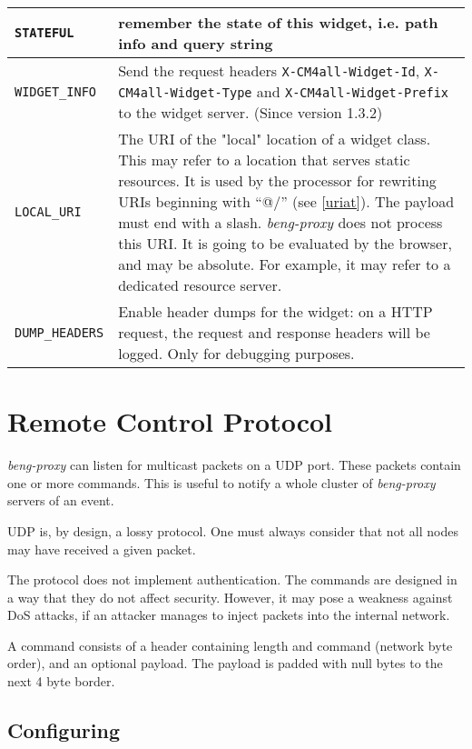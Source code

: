 \documentclass[a4paper,12pt]{article}
\begin{document}
\begin{longtable}{|l|p{8cm}|}
\verb|STATEFUL| & remember the state of this widget, i.e. path info
and query string \\

\hline

\verb|WIDGET_INFO| & Send the request headers
\verb|X-CM4all-Widget-Id|, \verb|X-CM4all-Widget-Type| and
\verb|X-CM4all-Widget-Prefix| to the widget server.
\scriptsize{(Since version 1.3.2)}\\

\hline

\label{localuri}
\verb|LOCAL_URI| & The URI of the "local" location of a widget class.
This may refer to a location that serves static resources.  It is used
by the processor for rewriting URIs beginning with ``@/'' (see
\ref{uriat}).  The payload must end with a slash.  \emph{beng-proxy}
does not process this URI.  It is going to be evaluated by the
browser, and may be absolute.  For example, it may refer to a
dedicated resource server. \\

\hline

\verb|DUMP_HEADERS| & Enable header dumps for the widget: on a HTTP
request, the request and response headers will be logged.  Only for
debugging purposes. \\

\hline
\end{longtable}


\section{Remote Control Protocol}

\emph{beng-proxy} can listen for multicast packets on a UDP port.
These packets contain one or more commands.  This is useful to notify
a whole cluster of \emph{beng-proxy} servers of an event.

UDP is, by design, a lossy protocol.  One must always consider that
not all nodes may have received a given packet.

The protocol does not implement authentication.  The commands are
designed in a way that they do not affect security.  However, it may
pose a weakness against DoS attacks, if an attacker manages to inject
packets into the internal network.

A command consists of a header containing length and command (network
byte order), and an optional payload.  The payload is padded with null
bytes to the next 4 byte border.

\subsection{Configuring}
\end{document}
